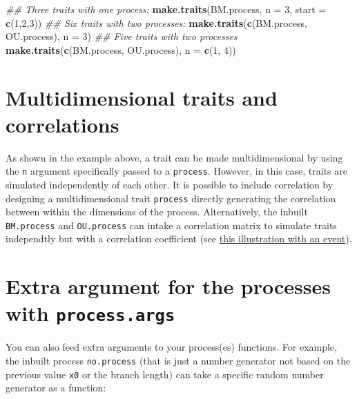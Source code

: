 \documentclass[
]{book}
\newenvironment{Shaded}{\begin{snugshade}}{\end{snugshade}}
\newcommand{\CommentTok}[1]{\textcolor[rgb]{0.56,0.35,0.01}{\textit{#1}}}
\newcommand{\DataTypeTok}[1]{\textcolor[rgb]{0.13,0.29,0.53}{#1}}
\newcommand{\DecValTok}[1]{\textcolor[rgb]{0.00,0.00,0.81}{#1}}
\newcommand{\KeywordTok}[1]{\textcolor[rgb]{0.13,0.29,0.53}{\textbf{#1}}}
\newcommand{\NormalTok}[1]{#1}
\begin{document}
\begin{Shaded}
\begin{Highlighting}[]
\CommentTok{\#\# Three traits with one process:}
\KeywordTok{make.traits}\NormalTok{(BM.process, }\DataTypeTok{n =} \DecValTok{3}\NormalTok{, }\DataTypeTok{start =} \KeywordTok{c}\NormalTok{(}\DecValTok{1}\NormalTok{,}\DecValTok{2}\NormalTok{,}\DecValTok{3}\NormalTok{))}
\CommentTok{\#\# Six traits with two processes:}
\KeywordTok{make.traits}\NormalTok{(}\KeywordTok{c}\NormalTok{(BM.process, OU.process), }\DataTypeTok{n =} \DecValTok{3}\NormalTok{)}
\CommentTok{\#\# Five traits with two processes}
\KeywordTok{make.traits}\NormalTok{(}\KeywordTok{c}\NormalTok{(BM.process, OU.process), }\DataTypeTok{n =} \KeywordTok{c}\NormalTok{(}\DecValTok{1}\NormalTok{, }\DecValTok{4}\NormalTok{))}
\end{Highlighting}
\end{Shaded}

\hypertarget{multidimensional-traits-and-correlations}{%
\section{Multidimensional traits and correlations}\label{multidimensional-traits-and-correlations}}

As shown in the example above, a trait can be made multidimensional by using the \texttt{n} argument specifically passed to a \texttt{process}.
However, in this case, traits are simulated independently of each other.
It is possible to include correlation by designing a multidimensional trait \texttt{process} directly generating the correlation between within the dimensions of the process.
Alternatively, the inbuilt \texttt{BM.process} and \texttt{OU.process} can intake a correlation matrix to simulate traits independtly but with a correlation coefficient (see \protect\hyperlink{EG_change_correlation}{this illustration with an event}).

\hypertarget{extra-argument-for-the-processes-with-process.args}{%
\section{\texorpdfstring{Extra argument for the processes with \texttt{process.args}}{Extra argument for the processes with process.args}}\label{extra-argument-for-the-processes-with-process.args}}

You can also feed extra arguments to your process(es) functions.
For example, the inbuilt process \texttt{no.process} (that is just a number generator not based on the previous value \texttt{x0} or the branch length) can take a specific random number generator as a function:
\end{document}

